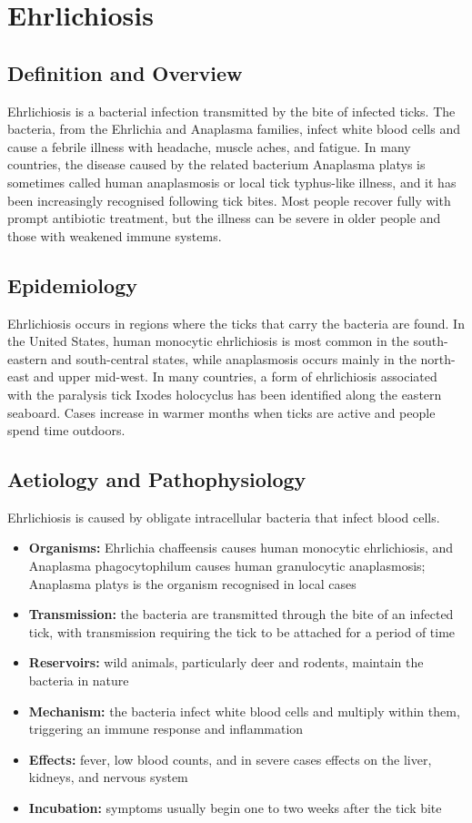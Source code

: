 \chapter{Ehrlichiosis}

\section*{Definition and Overview}
Ehrlichiosis is a bacterial infection transmitted by the bite of infected ticks. The bacteria, from the Ehrlichia and Anaplasma families, infect white blood cells and cause a febrile illness with headache, muscle aches, and fatigue. In many countries, the disease caused by the related bacterium Anaplasma platys is sometimes called human anaplasmosis or local tick typhus-like illness, and it has been increasingly recognised following tick bites. Most people recover fully with prompt antibiotic treatment, but the illness can be severe in older people and those with weakened immune systems.

\section*{Epidemiology}
Ehrlichiosis occurs in regions where the ticks that carry the bacteria are found. In the United States, human monocytic ehrlichiosis is most common in the south-eastern and south-central states, while anaplasmosis occurs mainly in the north-east and upper mid-west. In many countries, a form of ehrlichiosis associated with the paralysis tick Ixodes holocyclus has been identified along the eastern seaboard. Cases increase in warmer months when ticks are active and people spend time outdoors.

\section*{Aetiology and Pathophysiology}
Ehrlichiosis is caused by obligate intracellular bacteria that infect blood cells.
\begin{itemize}
    \item \textbf{Organisms:} Ehrlichia chaffeensis causes human monocytic ehrlichiosis, and Anaplasma phagocytophilum causes human granulocytic anaplasmosis; Anaplasma platys is the organism recognised in local cases
    \item \textbf{Transmission:} the bacteria are transmitted through the bite of an infected tick, with transmission requiring the tick to be attached for a period of time
    \item \textbf{Reservoirs:} wild animals, particularly deer and rodents, maintain the bacteria in nature
    \item \textbf{Mechanism:} the bacteria infect white blood cells and multiply within them, triggering an immune response and inflammation
    \item \textbf{Effects:} fever, low blood counts, and in severe cases effects on the liver, kidneys, and nervous system
    \item \textbf{Incubation:} symptoms usually begin one to two weeks after the tick bite
\end{itemize}

